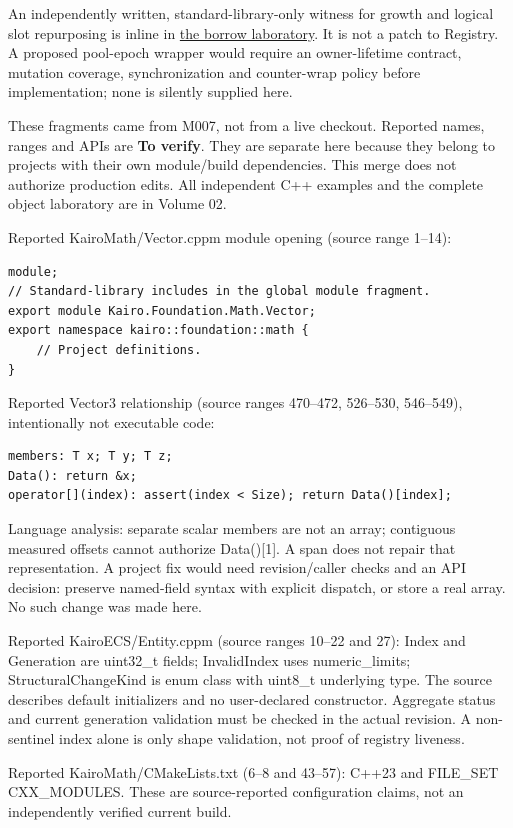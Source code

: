 An independently written, standard-library-only witness for growth and logical slot repurposing is inline in \hyperref[01-foundations-i-ch004-complete-runnable-borrow-laboratory]{the borrow laboratory}. It is not a patch to Registry. A proposed pool-epoch wrapper would require an owner-lifetime contract, mutation coverage, synchronization and counter-wrap policy before implementation; none is silently supplied here.

These fragments came from M007, not from a live checkout. Reported names, ranges and APIs are \textbf{To verify}. They are separate here because they belong to projects with their own module/build dependencies. This merge does not authorize production edits. All independent C++ examples and the complete object laboratory are in {Volume 02}.

Reported KairoMath/Vector.cppm module opening (source range 1--14):

\begin{verbatim}
module;
// Standard-library includes in the global module fragment.
export module Kairo.Foundation.Math.Vector;
export namespace kairo::foundation::math {
    // Project definitions.
}
\end{verbatim}

Reported Vector3 relationship (source ranges 470--472, 526--530, 546--549), intentionally not executable code:

\begin{verbatim}
members: T x; T y; T z;
Data(): return &x;
operator[](index): assert(index < Size); return Data()[index];
\end{verbatim}

Language analysis: separate scalar members are not an array; contiguous measured offsets cannot authorize Data(){[}1{]}. A span does not repair that representation. A project fix would need revision/caller checks and an API decision: preserve named-field syntax with explicit dispatch, or store a real array. No such change was made here.

Reported KairoECS/Entity.cppm (source ranges 10--22 and 27): Index and Generation are uint32\_t fields; InvalidIndex uses numeric\_limits; StructuralChangeKind is enum class with uint8\_t underlying type. The source describes default initializers and no user-declared constructor. Aggregate status and current generation validation must be checked in the actual revision. A non-sentinel index alone is only shape validation, not proof of registry liveness.

Reported KairoMath/CMakeLists.txt (6--8 and 43--57): C++23 and FILE\_SET CXX\_MODULES. These are source-reported configuration claims, not an independently verified current build.

